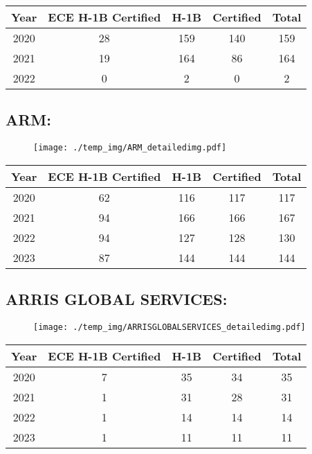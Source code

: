 \documentclass{article}%
\begin{document}
%
\begin{longtable}{c|c|c|c|c}%
\hline%
Year&ECE H{-}1B Certified&H{-}1B&Certified&Total\\%
\hline%
2020&28&159&140&159\\%
\hline%
2021&19&164&86&164\\%
\hline%
2022&0&2&0&2\\%
\hline%
\end{longtable}

%
\newpage%
\subsection{ARM:}%
\label{subsec:ARM}%
\label{ARMdetailed}%


\begin{figure}[htbp]%
\centering%
\texttt{[image: ./temp\_img/ARM\_detailedimg.pdf]}%
\end{figure}

%
\begin{longtable}{c|c|c|c|c}%
\hline%
Year&ECE H{-}1B Certified&H{-}1B&Certified&Total\\%
\hline%
2020&62&116&117&117\\%
\hline%
2021&94&166&166&167\\%
\hline%
2022&94&127&128&130\\%
\hline%
2023&87&144&144&144\\%
\hline%
\end{longtable}

%
\newpage%
\subsection{ARRIS GLOBAL SERVICES:}%
\label{subsec:ARRISGLOBALSERVICES}%
\label{ARRISGLOBALSERVICESdetailed}%


\begin{figure}[htbp]%
\centering%
\texttt{[image: ./temp\_img/ARRISGLOBALSERVICES\_detailedimg.pdf]}%
\end{figure}

%
\begin{longtable}{c|c|c|c|c}%
\hline%
Year&ECE H{-}1B Certified&H{-}1B&Certified&Total\\%
\hline%
2020&7&35&34&35\\%
\hline%
2021&1&31&28&31\\%
\hline%
2022&1&14&14&14\\%
\hline%
2023&1&11&11&11\\%
\hline%
\end{longtable}
\end{document}
